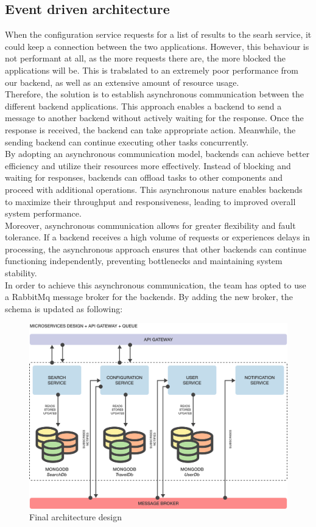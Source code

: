 \documentclass[./chapters/design.tex]{subfiles}
\begin{document}
\subsection{Event driven architecture}
When the configuration service requests for a list of results to the searh
service, it could keep a connection between the two applications. However, this
behaviour is not performant at all, as the more requests there are, the more
blocked the applications will be. This is trabslated to an extremely poor
performance from our backend, as well as an extensive amount of resource usage.
\\
Therefore, the solution is to establish asynchronous communication between the
different backend applications. This approach enables a backend to send a
message to another backend without actively waiting for the response. Once the
response is received, the backend can take appropriate action. Meanwhile, the
sending backend can continue executing other tasks concurrently.
\\
By adopting an asynchronous communication model, backends can achieve better
efficiency and utilize their resources more effectively. Instead of blocking and
waiting for responses, backends can offload tasks to other components and
proceed with additional operations. This asynchronous nature enables backends to
maximize their throughput and responsiveness, leading to improved overall system
performance.
\\
Moreover, asynchronous communication allows for greater flexibility and fault
tolerance. If a backend receives a high volume of requests or experiences delays
in processing, the asynchronous approach ensures that other backends can
continue functioning independently, preventing bottlenecks and maintaining
system stability.
\\[8pt]
In order to achieve this asynchronous communication, the team has opted to use a
RabbitMq message broker for the backends. By adding the new broker, the schema
is updated as following:
\begin{figure}[H]
	\centering
	\includegraphics[width=\textwidth]{./assets/microservice-gateway-queue-struct.png}
	\caption{Final architecture design}
\end{figure}
\end{document}
